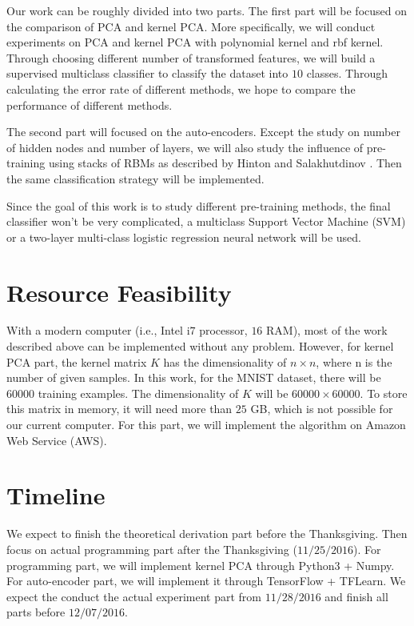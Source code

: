 \documentclass{article}
\begin{document}
Our work can be roughly divided into two parts. The first part will be focused on the comparison of PCA and kernel PCA. More specifically, we will conduct experiments on PCA and kernel PCA with polynomial kernel and rbf kernel. Through choosing different number of transformed features, we will build a supervised multiclass classifier to classify the dataset into $10$ classes. Through calculating the error rate of different methods, we hope to compare the performance of different methods.

The second part will focused on the auto-encoders. Except the study on number of hidden nodes and number of layers, we will also study the influence of pre-training using stacks of RBMs as described by Hinton and Salakhutdinov \cite{hinton2006reducing}. Then the same classification strategy will be implemented.

Since the goal of this work is to study different pre-training methods, the final classifier won't be very complicated, a multiclass Support Vector Machine (SVM) or a two-layer multi-class logistic regression neural network will be used.

\section{Resource Feasibility}
\label{sec:feasibility}

With a modern computer (i.e., Intel i$7$ processor, $16$ RAM), most of the work described above can be implemented without any problem. However, for kernel PCA part, the kernel matrix $K$ has the dimensionality of $n \times n$, where n is the number of given samples. In this work, for the MNIST dataset, there will be $60000$ training examples. The dimensionality of $K$ will be $60000 \times 60000$. To store this matrix in memory, it will need more than $25$ GB, which is not possible for our current computer. For this part, we will implement the algorithm on Amazon Web Service (AWS).

\section{Timeline}
\label{sec:timeline}

We expect to finish the theoretical derivation part before the Thanksgiving. Then focus on actual programming part after the Thanksgiving ($11/25/2016$). For programming part, we will implement kernel PCA through Python3 + Numpy. For auto-encoder part, we will implement it through TensorFlow + TFLearn. We expect the conduct the actual experiment part from $11/28/2016$ and finish all parts before $12/07/2016$.

\vfill\pagebreak


%

\end{document}
